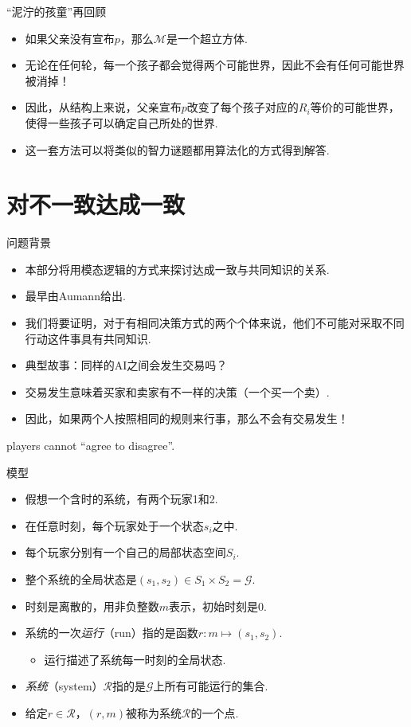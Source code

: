 \begin{frame}{“泥泞的孩童”再回顾}
\begin{itemize}
    \item 如果父亲没有宣布$p$，那么$\mathcal M$是一个超立方体.
    \item 无论在任何轮，每一个孩子都会觉得两个可能世界，因此不会有任何可能世界被消掉！
    \item 因此，从结构上来说，父亲宣布$p$改变了每个孩子对应的$R_i$等价的可能世界，使得一些孩子可以确定自己所处的世界.
    \item 这一套方法可以将类似的智力谜题都用算法化的方式得到解答.
\end{itemize}
\end{frame}

\section{对不一致达成一致}

\begin{frame}{问题背景}
\begin{itemize}
    \item 本部分将用模态逻辑的方式来探讨达成一致与共同知识的关系.
    \item 最早由Aumann给出.
    \item 我们将要证明，对于有相同决策方式的两个个体来说，他们不可能对采取不同行动这件事具有共同知识.
    \item 典型故事：同样的AI之间会发生交易吗？
    \item 交易发生意味着买家和卖家有不一样的决策（一个买一个卖）.
    \item 因此，如果两个人按照相同的规则来行事，那么不会有交易发生！
\end{itemize}
\begin{center}
    players cannot ``agree to disagree''.
\end{center}
\end{frame}

\begin{frame}{模型}
\begin{itemize}
    \item 假想一个含时的系统，有两个玩家1和2.
    \item 在任意时刻，每个玩家处于一个状态$s_i$之中.
    \item 每个玩家分别有一个自己的局部状态空间$S_i$.
    \item 整个系统的全局状态是$(s_1,s_2)\in S_1\times S_2=\mathcal G$.
    \item 时刻是离散的，用非负整数$m$表示，初始时刻是$0$.
    \item 系统的一次\emph{运行}（run）指的是函数$r:m\mapsto(s_1,s_2)$.
    \begin{itemize}
        \item 运行描述了系统每一时刻的全局状态.
    \end{itemize}
    \item \emph{系统}（system）$\mathcal R$指的是$\mathcal G$上所有可能运行的集合.
    \item 给定$r\in\mathcal R$，$(r,m)$被称为系统$\mathcal R$的一个点.
\end{itemize}
\end{frame}

